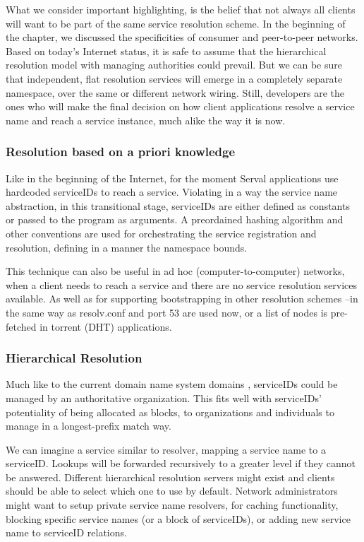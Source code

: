 What we consider important highlighting, is the belief that not always all clients will want to be part of the same service resolution scheme.
In the beginning of the chapter, we discussed the specificities of consumer and peer-to-peer networks.
Based on today's Internet status, it is safe to assume that the hierarchical resolution model with managing authorities could prevail.
But we can be sure that independent, flat resolution services will emerge in a completely separate namespace, over the same or different network wiring.
Still, developers are the ones who will make the final decision on how client applications resolve a service name and reach a service instance, much alike the way it is now.



\subsubsection{Resolution based on a priori knowledge}
Like in the beginning of the Internet, for the moment Serval applications use hardcoded serviceIDs to reach a service.
Violating in a way the service name abstraction, in this transitional stage, serviceIDs are either defined as constants or passed to the program as arguments.
A preordained hashing algorithm and other conventions are used for orchestrating the service registration and resolution, defining in a manner the namespace bounds.

This technique can also be useful in ad hoc (computer-to-computer) networks, when a client needs to reach a service and there are no service resolution services available.
As well as for supporting bootstrapping in other resolution schemes --in the same way as resolv.conf and port 53 are used now, or a list of nodes is pre-fetched in torrent (DHT) applications.


\subsubsection{Hierarchical Resolution}
\label{sec:hierresol}
Much like to the current domain name system domains , serviceIDs could be managed by an authoritative organization.
This fits well with serviceIDs' potentiality of being allocated as blocks, to organizations and individuals to manage in a longest-prefix match way.

We can imagine a service similar to resolver, mapping a service name to a serviceID.
Lookups will be forwarded recursively to a greater level if they cannot be answered.
Different hierarchical resolution servers might exist and clients should be able to select which one to use by default.
Network administrators might want to setup private service name resolvers, for caching functionality, blocking specific service names (or a block of serviceIDs), or adding new service name to serviceID relations.




